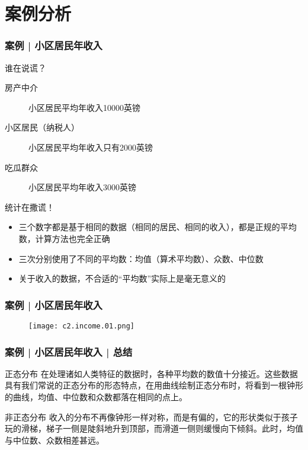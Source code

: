 \section{案例分析}
\begin{frame}
  \frametitle{案例 | 小区居民年收入}
  \begin{block}{谁在说谎？}
    \begin{description}
      \item[房产中介] 小区居民平均年收入10000英镑
      \item[小区居民（纳税人）] 小区居民平均年收入只有2000英镑
      \item[吃瓜群众] 小区居民平均年收入3000英镑
    \end{description}
  \end{block}
  \pause \pause \pause \pause
  \begin{block}{统计在撒谎！}
    \begin{itemize}
      \item 三个数字都是基于相同的数据（相同的居民、相同的收入），都是正规的平均数，计算方法也完全正确
      \item 三次分别使用了不同的平均数：均值（算术平均数）、众数、中位数
      \item 关于收入的数据，不合适的“平均数”实际上是毫无意义的
    \end{itemize}
  \end{block}
\end{frame}

\begin{frame}
  \frametitle{案例 | 小区居民年收入}
  \begin{figure}
    \centering
    \texttt{[image: c2.income.01.png]}
  \end{figure}
\end{frame}

\begin{frame}
  \frametitle{案例 | 小区居民年收入 | 总结}
  \begin{block}{正态分布}
在处理诸如人类特征的数据时，各种平均数的数值十分接近。这些数据具有我们常说的正态分布的形态特点，在用曲线绘制正态分布时，将看到一根钟形的曲线，均值、中位数和众数都落在相同的点上。
  \end{block}
  \pause
  \begin{block}{非正态分布}
收入的分布不再像钟形一样对称，而是有偏的，它的形状类似于孩子玩的滑梯，梯子一侧是陡斜地升到顶部，而滑道一侧则缓慢向下倾斜。此时，均值与中位数、众数相差甚远。
  \end{block}
  \vspace{-0.5em}
  \begin{figure}
    \centering
    \quad
  \end{figure}
\end{frame}

